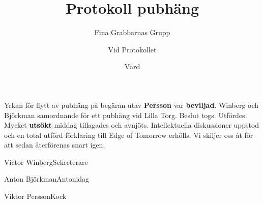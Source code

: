 \documentclass{fgg}
\title{Protokoll pubhäng}
\author{Fina Grabbarnas Grupp}
\date{\formatdate{7}{8}{2019}}
\begin{document}
\makehf
\maketitle

\begin{narvaro}
\end{narvaro}

\begin{protokoll}
	Yrkan för flytt av pubhäng på begäran utav \textbf{Persson} var \textbf{beviljad}.
	Winberg och Björkman samordnande för ett pubhäng vid Lilla Torg.
	Beslut togs.
	Utfördes.
	Mycket \textbf{utsökt} middag tillagades och avnjöts. Intellektuella diskussioner uppstod och en total utförd förklaring till Edge of Tomorrow erhölls.
	Vi skiljer oss åt för att sedan återförenas snart igen.
\end{protokoll}

\signature{Vid Protokollet}{Victor Winberg}{Sekreterare}
\signature{}{Anton Björkman}{Antonidag}
\signature{Värd}{Viktor Persson}{Kock}
\end{document}

